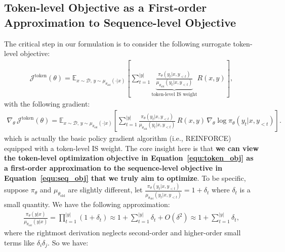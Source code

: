 \documentclass{article}
\begin{document}
\subsection{Token-level Objective as a First-order Approximation to Sequence-level Objective}

The critical step in our formulation is to consider the following surrogate token-level objective:
\begin{align}
\label{equ:token_obj}
\mathcal{J}^\text{token}(\theta)
=
\mathbb{E}_{ x \sim \mathcal{D}, \, y \sim \mu_{ \theta_\text{old} } ( \cdot | x ) } \left[ \sum_{t=1}^{|y|} 
\underbrace{
    \frac{ \pi_\theta ( y_t | x, y_{<t} ) }{ \mu_{ \theta_\text{old} } ( y_t | x, y_{<t} ) }
}_\text{token-level IS weight}
R(x, y)
\right],
\end{align}
with the following gradient:
\begin{align}
\label{equ:token_grad}
\nabla_\theta \, \mathcal{J}^\text{token}(\theta)
=
\mathbb{E}_{ x \sim \mathcal{D}, \, y \sim \mu_{ \theta_\text{old} } ( \cdot | x ) }
\left[ \sum_{t=1}^{|y|} \frac{ \pi_\theta ( y_t | x, y_{<t} ) }{ \mu_{ \theta_\text{old} } ( y_t | x, y_{<t} ) } \, R(x, y) \, \nabla_\theta \log \pi_\theta ( y_t | x, y_{<t} ) \right].
\end{align}
which is actually the basic policy gradient algorithm (i.e., REINFORCE) equipped with a token-level IS weight.
The core insight here is that \textbf{we can view the token-level optimization objective in Equation~\eqref{equ:token_obj} as a first-order approximation to the sequence-level objective in Equation~\eqref{equ:seq_obj} that we truly aim to optimize}.
To be specific, suppose \( \pi_\theta \) and \( \mu_{ \theta_\text{old} } \) are slightly different, let \( \frac{ \pi_\theta ( y_t | x, y_{<t} ) }{ \mu_{ \theta_\text{old} } ( y_t | x, y_{<t} ) } = 1 + \delta_t \) where \( \delta_t \) is a small quantity.
We have the following approximation:
\begin{align*}
\frac{ \pi_\theta ( y | x ) }{ \mu_{ \theta_\text{old} } ( y | x ) }
=
\prod_{t=1}^{|y|} \left( 1 + \delta_t \right)
\approx
1 + \sum_{t=1}^{|y|} \delta_t + O \left( \delta^2 \right)
\approx
1 + \sum_{t=1}^{|y|} \delta_t,
\end{align*}
where the rightmost derivation neglects second-order and higher-order small terms like \(\delta_i \delta_j\).
So we have:
\end{document}
